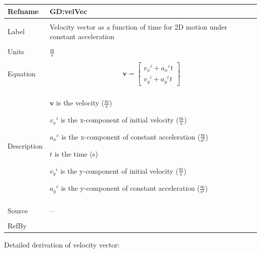 \documentclass[12pt]{article}
\begin{document}
\noindent \begin{minipage}{\textwidth}
\begin{tabular}{p{} p{}}
\toprule \textbf{Refname} & \textbf{GD:velVec}
\label{GD:velVec}
\\ \midrule \\
Label & Velocity vector as a function of time for 2D motion under constant acceleration
\\ \midrule \\
Units & $\frac{\text{m}}{\text{s}}$
\\ \midrule \\
Equation & \begin{displaymath}
           \mathbf{v}=\begin{bmatrix}
{{v_{x}}^{i}}+{{a_{x}}^{c}} t\\
{{v_{y}}^{i}}+{{a_{y}}^{c}} t
\end{bmatrix}
           \end{displaymath}
\\ \midrule \\
Description & \begin{symbDescription}
              \item{$\mathbf{v}$ is the velocity ($\frac{\text{m}}{\text{s}}$)}
              \item{${{v_{x}}^{i}}$ is the x-component of initial velocity ($\frac{\text{m}}{\text{s}}$)}
              \item{${{a_{x}}^{c}}$ is the x-component of constant acceleration ($\frac{\text{m}}{\text{s}^{2}}$)}
              \item{$t$ is the time (s)}
              \item{${{v_{y}}^{i}}$ is the y-component of initial velocity ($\frac{\text{m}}{\text{s}}$)}
              \item{${{a_{y}}^{c}}$ is the y-component of constant acceleration ($\frac{\text{m}}{\text{s}^{2}}$)}
              \end{symbDescription}
\\ \midrule \\
Source & --
\\ \midrule \\
RefBy & 
\\ \bottomrule \end{tabular}
\end{minipage}
Detailed derivation of velocity vector:
\end{document}
